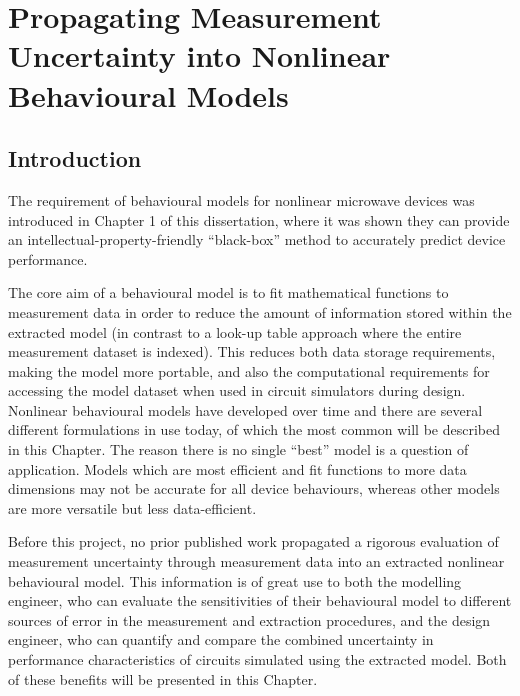 \documentclass[../thesis/thesis.tex]{subfiles}
\begin{document}
	
\onlyinsubfile{\setcounter{chapter}{4}}

\chapter[Prop. Meas. Unc. To Nonlinear Behavioural Models]{Propagating Measurement Uncertainty into Nonlinear Behavioural Models}
\section{Introduction}

The requirement of behavioural models for nonlinear microwave devices was introduced in Chapter 1 of this dissertation, where it was shown they can provide an intellectual-property-friendly ``black-box'' method to accurately predict device performance.

The core aim of a behavioural model is to fit mathematical functions to measurement data in order to reduce the amount of information stored within the extracted model (in contrast to a look-up table approach where the entire measurement dataset is indexed). This reduces both data storage requirements, making the model more portable, and also the computational requirements for accessing the model dataset when used in circuit simulators during design. Nonlinear behavioural models have developed over time and there are several different formulations in use today, of which the most common will be described in this Chapter. The reason there is no single ``best'' model is a question of application. Models which are most efficient and fit functions to more data dimensions may not be accurate for all device behaviours, whereas other models are more versatile but less data-efficient.

Before this project, no prior published work propagated a rigorous evaluation of measurement uncertainty through measurement data into an extracted nonlinear behavioural model. This information is of great use to both the modelling engineer, who can evaluate the sensitivities of their behavioural model to different sources of error in the measurement and extraction procedures, and the design engineer, who can quantify and compare the combined uncertainty in performance characteristics of circuits simulated using the extracted model. Both of these benefits will be presented in this Chapter.

\end{document}
